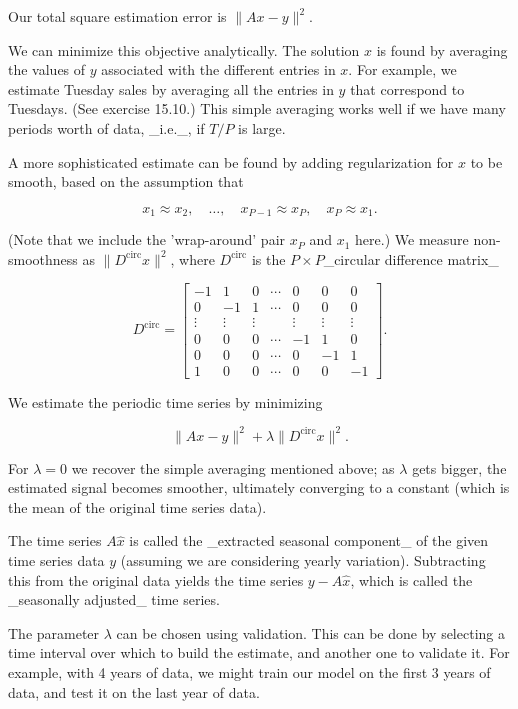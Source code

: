 Our total square estimation error is \(\|Ax-y\|^{2}\).

We can minimize this objective analytically. The solution \(\hat{x}\) is found by averaging the values of \(y\) associated with the different entries in \(x\). For example, we estimate Tuesday sales by averaging all the entries in \(y\) that correspond to Tuesdays. (See exercise 15.10.) This simple averaging works well if we have many periods worth of data, _i.e._, if \(T/P\) is large.

A more sophisticated estimate can be found by adding regularization for \(x\) to be smooth, based on the assumption that

\[x_{1}\approx x_{2},\quad\ldots,\quad x_{P-1}\approx x_{P},\quad x_{P}\approx x _{1}.\]

(Note that we include the 'wrap-around' pair \(x_{P}\) and \(x_{1}\) here.) We measure non-smoothness as \(\|D^{\mathrm{circ}}x\|^{2}\), where \(D^{\mathrm{circ}}\) is the \(P\times P\)_circular difference matrix_

\[D^{\mathrm{circ}}=\left[\begin{array}{ccccccc}-1&1&0&\cdots&0&0&0\\ 0&-1&1&\cdots&0&0&0\\ \vdots&\vdots&\vdots&&\vdots&\vdots&\vdots\\ 0&0&0&\cdots&-1&1&0\\ 0&0&0&\cdots&0&-1&1\\ 1&0&0&\cdots&0&0&-1\end{array}\right].\]

We estimate the periodic time series by minimizing

\[\|Ax-y\|^{2}+\lambda\|D^{\mathrm{circ}}x\|^{2}.\]

For \(\lambda=0\) we recover the simple averaging mentioned above; as \(\lambda\) gets bigger, the estimated signal becomes smoother, ultimately converging to a constant (which is the mean of the original time series data).

The time series \(A\hat{x}\) is called the _extracted seasonal component_ of the given time series data \(y\) (assuming we are considering yearly variation). Subtracting this from the original data yields the time series \(y-A\hat{x}\), which is called the _seasonally adjusted_ time series.

The parameter \(\lambda\) can be chosen using validation. This can be done by selecting a time interval over which to build the estimate, and another one to validate it. For example, with 4 years of data, we might train our model on the first 3 years of data, and test it on the last year of data.


